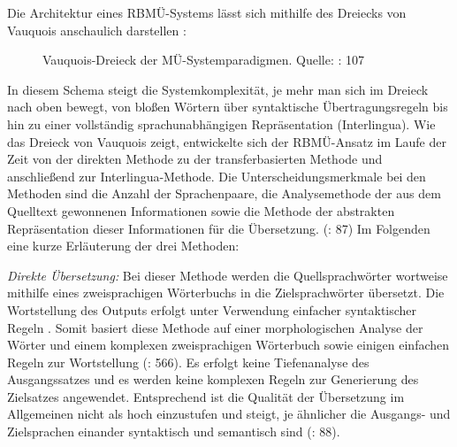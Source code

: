 Die Architektur eines RBMÜ-Systems lässt sich mithilfe des Dreiecks von Vauquois anschaulich darstellen \citep{Vauquois1968}:


\begin{figure}

\caption{Vauquois-Dreieck der MÜ-Systemparadigmen. Quelle: \citealt{HutchinsSomers1992}: 107}
\label{fig:3:1}
\end{figure}


In diesem Schema steigt die Systemkomplexität, je mehr man sich im Dreieck nach oben bewegt, von bloßen Wörtern über syntaktische Übertragungsregeln bis hin zu einer vollständig sprachunabhängigen Repräsentation (Interlingua). Wie das Dreieck von Vauquois zeigt, entwickelte sich der RBMÜ-Ansatz im Laufe der Zeit von der direkten Methode zu der transferbasierten Methode und anschließend zur Interlingua-Methode. Die Unterscheidungsmerkmale bei den Methoden sind die Anzahl der Sprachenpaare, die Analysemethode der aus dem Quelltext gewonnenen Informationen sowie die Methode der abstrakten Repräsentation dieser Informationen für die Übersetzung. (\citealt{WerthmannWitt2014}: 87) Im Folgenden eine kurze Erläuterung der drei Methoden:

\textit{Direkte Übersetzung:} Bei dieser Methode werden die Quellsprachwörter wortweise mithilfe eines zweisprachigen Wörterbuchs in die Zielsprachwörter übersetzt. Die Wortstellung des Outputs erfolgt unter Verwendung einfacher syntaktischer Regeln \citep{Stein2009}. Somit basiert diese Methode auf einer morphologischen Analyse der Wörter und einem komplexen zweisprachigen Wörterbuch sowie einigen einfachen Regeln zur Wortstellung (\citealt{CarstensenEtAl2004}: 566). Es erfolgt keine Tiefenanalyse des Ausgangssatzes und es werden keine komplexen Regeln zur Generierung des Zielsatzes angewendet. Entsprechend ist die Qualität der Übersetzung im Allgemeinen nicht als hoch einzustufen und steigt, je ähnlicher die Ausgangs- und Zielsprachen einander syntaktisch und semantisch sind (\citealt{WerthmannWitt2014}: 88).

